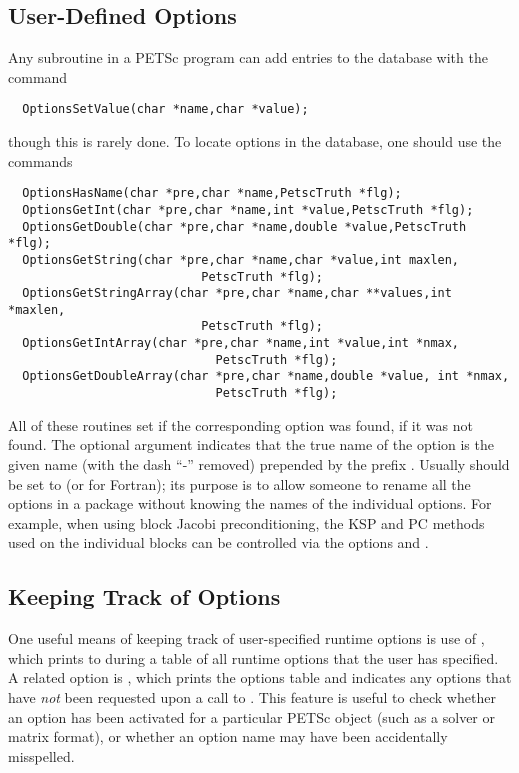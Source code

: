 \subsection{User-Defined Options}

Any subroutine in a PETSc program can add entries to the database with the 
command 
\begin{verbatim}
  OptionsSetValue(char *name,char *value);
\end{verbatim}
though this is rarely done.
To locate options in the database, one should use the
commands  
\begin{verbatim}
  OptionsHasName(char *pre,char *name,PetscTruth *flg);
  OptionsGetInt(char *pre,char *name,int *value,PetscTruth *flg);
  OptionsGetDouble(char *pre,char *name,double *value,PetscTruth *flg);
  OptionsGetString(char *pre,char *name,char *value,int maxlen,
                           PetscTruth *flg);
  OptionsGetStringArray(char *pre,char *name,char **values,int *maxlen,
                           PetscTruth *flg);
  OptionsGetIntArray(char *pre,char *name,int *value,int *nmax,
                             PetscTruth *flg);
  OptionsGetDoubleArray(char *pre,char *name,double *value, int *nmax,
                             PetscTruth *flg);
\end{verbatim}
All 
of  
these 
routines set  if the corresponding option was found,  if it
was not found.  The optional argument
 indicates that the true name of the option is the given name
(with the dash ``-'' removed) prepended by the prefix .
Usually  should be set to  (or 
for Fortran); its purpose is to
allow someone to rename all the options in a package without knowing
the names of the individual options.  For example, when using block
Jacobi preconditioning, the KSP and PC methods used on the individual
blocks can be controlled via the options  and . 

\subsection{Keeping Track of Options}

One useful means of keeping track of user-specified runtime options is
use of , which prints to  during  a table of all runtime options that the user has
specified.   A related option is ,
 which prints the options table and indicates
any options that have {\em not} been requested upon a call to .  This feature is useful to check whether an option
has been activated for a particular PETSc object (such as a solver or
matrix format), or whether an option name may have been accidentally
misspelled.

